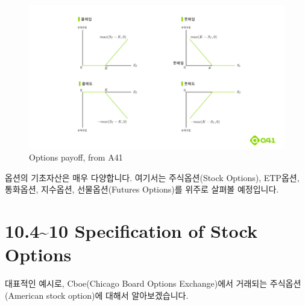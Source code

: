 \documentclass[
  letterpaper,
  DIV=11,
  numbers=noendperiod]{scrreprt}
\begin{document}
\begin{figure}[H]

{\centering \includegraphics{images/Options_payoff.png}

}

\caption{Options payoff, from A41}

\end{figure}%

옵션의 기초자산은 매우 다양합니다. 여기서는 주식옵션(Stock Options),
ETP옵션, 통화옵션, 지수옵션, 선물옵션(Futures Options)를 위주로 살펴볼
예정입니다.

\section*{10.4\textasciitilde10 Specification of Stock
Options}\label{specification-of-stock-options}


대표적인 예시로, Cboe(Chicago Board Options Exchange)에서 거래되는
주식옵션(American stock option)에 대해서 알아보겠습니다.
\end{document}
